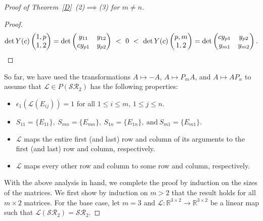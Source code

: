 \documentclass[11pt,reqno]{amsart}
\theoremstyle{plain}
\theoremstyle{definition}
\numberwithin{equation}{section}
\begin{document}
\begin{proof}[Proof of Theorem~\ref{D}~(2)$\implies$(3) for $m\neq n$]
\begin{proof}
		\[ \det Y(c)\begin{pmatrix}1,p\\1,2\end{pmatrix} =
		\det\begin{pmatrix} y_{11} & y_{12} \\ cy_{p1} & y_{p2}
		\end{pmatrix} \ < \ 0 \ < \
		\det Y(c)\begin{pmatrix}p,m\\1,2\end{pmatrix} =
		\det\begin{pmatrix} cy_{p1} & y_{p2} \\ y_{m1} & y_{m2}
		\end{pmatrix}. \qedhere
		\]
	\end{proof}
	So far, we have used the transformations $A\mapsto-A$, $A\mapsto P_mA$, and $A\mapsto AP_n$ to assume that $\mathcal{L}\in P(\mathcal{SR}_2)$ has the following properties:
	\begin{itemize}
		\item[(i)] $\epsilon_1(\mathcal{L}(E_{ij}))=1$ for all $1\leq i\leq m$, $1\leq j\leq n$.
		
		\item[(ii)] $S_{11}=\{E_{11}\},~ S_{mn}=\{E_{mn}\},~ S_{1n}=\{E_{1n}\}, ~\text{and}~ S_{m1}=\{E_{m1}\}$.
		
		\item[(iii)]  $\mathcal{L}$ maps the entire first (and last) row and column of its arguments to the first (and last) row and column, respectively.
		
		\item[(iv)] $\mathcal{L}$ maps every other row and column to some row and column, respectively.
	\end{itemize} 
	With the above analysis in hand, we complete the proof by induction on the sizes of the matrices. We first show by induction on $m>2$ that the result holds for all $m\times2$ matrices. For the base case, let $m=3$ and $\mathcal{L}:\mathbb{R}^{3\times2}\to\mathbb{R}^{3\times2}$ be a linear map such that $\mathcal{L}(\mathcal{SR}_2)=\mathcal{SR}_2$. 
	

\end{proof}
\end{document}
